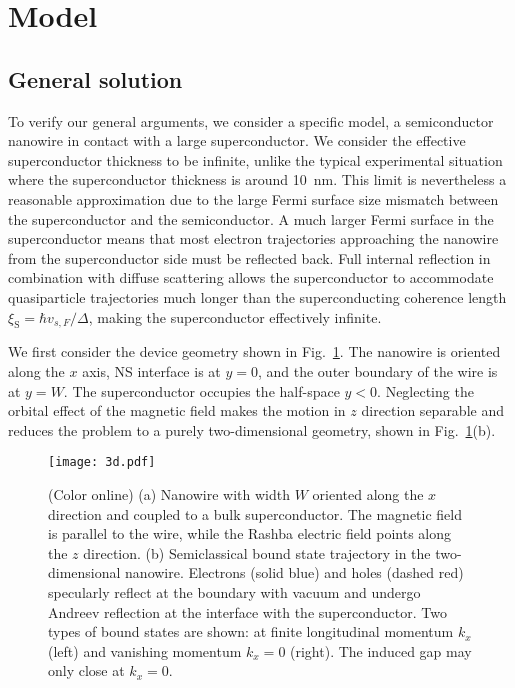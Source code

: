 \documentclass[twocolumn, notitlepage, 10pt, aps, floatfix, showpacs, prb, citeautoscript]{revtex4-1}
\newcommand{\comment}[1]{}
\begin{document}
\section{Model}
\label{sec:1stmodel}
\subsection{General solution}
\label{sub:gen}
\comment{Clean infinite superconductor limit is not unreasonable.}
To verify our general arguments, we consider a specific model, a semiconductor nanowire in contact with a large superconductor.
We consider the effective superconductor thickness to be infinite, unlike the typical experimental situation where the superconductor thickness is around \SI{10}{\nm}.
This limit is nevertheless a reasonable approximation due to the large Fermi surface size mismatch between the superconductor and the semiconductor.
A much larger Fermi surface in the superconductor means that most electron trajectories approaching the nanowire from the superconductor side must be reflected back.
Full internal reflection in combination with diffuse scattering allows the superconductor to accommodate quasiparticle trajectories much longer than the superconducting coherence length $\xi_\mathrm S=\hbar v_{s,F}/\Delta$, making the superconductor effectively infinite.

\comment{We consider a planar geometry without orbital effect of the magnetic field}
We first consider the device geometry shown in Fig.~\ref{fig:1stmodel}.
The nanowire is oriented along the $x$ axis, NS interface is at $y=0$, and the outer boundary of the wire is at $y=W$.
The superconductor occupies the half-space $y<0$.
Neglecting the orbital effect of the magnetic field makes the motion in $z$ direction separable and reduces the problem to a purely two-dimensional geometry, shown in Fig.~\ref{fig:1stmodel}(b).

\begin{figure}[t]
\texttt{[image: 3d.pdf]}
\caption{(Color online) (a) Nanowire with width $W$ oriented along the $x$ direction and coupled to a bulk superconductor.
The magnetic field is parallel to the wire, while the Rashba electric field points along the $z$ direction.
(b) Semiclassical bound state trajectory in the two-dimensional nanowire. Electrons (solid blue) and holes (dashed red) specularly reflect at the boundary with vacuum and undergo Andreev reflection at the interface with the superconductor.
Two types of bound states are shown: at finite longitudinal momentum $k_x$ (left) and vanishing momentum $k_x=0$ (right).
The induced gap may only close at $k_x = 0$.}
\label{fig:1stmodel}
\end{figure}
\end{document}
